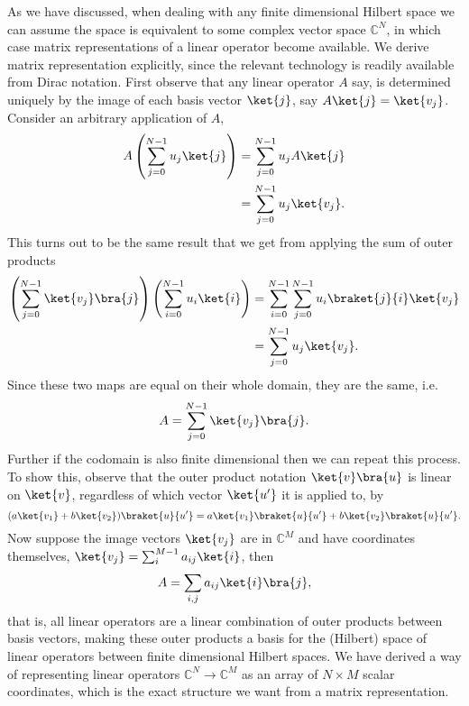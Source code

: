 As we have discussed, when dealing with any finite dimensional Hilbert space we can assume the space is equivalent to some complex vector space $\mathbb{C}^N$, in which case matrix representations of a linear operator become available. We derive matrix representation explicitly, since the relevant technology is readily available from Dirac notation. First observe that any linear operator $A$ say, is determined uniquely by the image of each basis vector $\ket{j}$, say $A\ket{j} = \ket{v_j}$. Consider an arbitrary application of $A$,
\begin{align*}
	A\left(\sum_{j=0}^{N-1}u_j\ket{j}\right)
	&= \sum_{j=0}^{N-1}u_jA\ket{j}
	\\&= \sum_{j=0}^{N-1}u_j\ket{v_j}.
\end{align*}
This turns out to be the same result that we get from applying the sum of outer products
\begin{align*}
	\left(\sum_{j=0}^{N-1}\ket{v_j}\bra{j}\right)\left(\sum_{i=0}^{N-1}u_i\ket{i}\right)
	&= \sum_{i=0}^{N-1}\sum_{j=0}^{N-1}u_i\braket{j}{i}\ket{v_j}
	\\&= \sum_{j=0}^{N-1}u_j\ket{v_j}.
\end{align*}
Since these two maps are equal on their whole domain, they are the same, i.e.
\[A = \sum_{j=0}^{N-1} \ket{v_j}\bra{j}.\]
Further if the codomain is also finite dimensional then we can repeat this process. To show this, observe that the outer product notation $\ket{v}\bra{u}$ is linear on $\ket{v}$, regardless of which vector $\ket{u'}$ it is applied to, by
\[(a\ket{v_1}+b\ket{v_2})\braket{u}{u'} = a\ket{v_1}\braket{u}{u'}+b\ket{v_2}\braket{u}{u'}.\]
Now suppose the image vectors $\ket{v_j}$ are in $\mathbb{C}^M$ and have coordinates themselves, $\ket{v_j} = \sum_i^{M-1} a_{ij}\ket{i}$, then
\begin{align*}
	A = \sum_{i,j} a_{ij}\ket{i}\bra{j},
\end{align*}
that is, all linear operators are a linear combination of outer products between basis vectors, making these outer products a basis for the (Hilbert) space of linear operators between finite dimensional Hilbert spaces. We have derived a way of representing linear operators $\mathbb{C}^N \to \mathbb{C}^M$ as an array of $N \times M$ scalar coordinates, which is the exact structure we want from a matrix representation.

